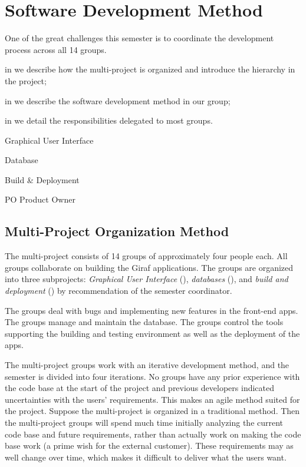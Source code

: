 \chapter{Software Development Method}\label{chap:sw_dev_method}
One of the great challenges this semester is to coordinate the development process across all 14 groups. 


\begin{chapterorganization}
  \item in  we describe how the multi-project is organized and introduce the hierarchy in the project;
  \item in  we describe the software development method in our group;
  \item in  we detail the responsibilities delegated to most groups.
\end{chapterorganization}

\begin{abbreviations}
  \item[\gui] Graphical User Interface
  \item[\db] Database
  \item[\bd] Build \& Deployment
  \item[PO] Product Owner
\end{abbreviations}

\section{Multi-Project Organization Method}\label{sec:project_overview}
The multi-project consists of 14 groups of approximately four people each. All groups collaborate on building the Giraf applications. The groups are organized into three subprojects: \emph{Graphical User Interface} (\gui), \emph{databases} (\db), and \emph{build and deployment} (\bd) by recommendation of the semester coordinator.

The \gui groups deal with bugs and implementing new features in the front-end apps. The \db groups manage and maintain the database. The \bd groups control the tools supporting the building and testing environment as well as the deployment of the apps.

The multi-project groups work with an iterative development method, and the semester is divided into four iterations. No groups have any prior experience with the code base at the start of the project and previous developers indicated uncertainties with the users' requirements. This makes an agile method suited for the project. Suppose the multi-project is organized in a traditional method. Then the multi-project groups will spend much time initially analyzing the current code base and future requirements, rather than actually work on making the code base work (a prime wish for the external customer). These requirements may as well change over time, which makes it difficult to deliver what the users want.

